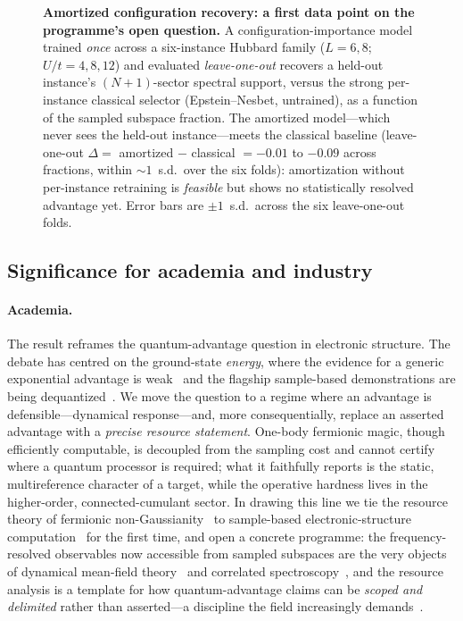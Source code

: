 \begin{figure}[htbp]\centering
\caption{\textbf{Amortized configuration recovery: a first data point on the programme's open question.}
A configuration-importance model trained \emph{once} across a six-instance Hubbard family
($L=6,8$; $U/t=4,8,12$) and evaluated \emph{leave-one-out} recovers a held-out instance's
$(N{+}1)$-sector spectral support, versus the strong per-instance classical selector (Epstein--Nesbet,
untrained), as a function of the sampled subspace fraction. The amortized model---which never sees the
held-out instance---meets the classical baseline (leave-one-out $\Delta=$ amortized $-$ classical
$=-0.01$ to $-0.09$ across fractions, within $\sim\!1$~s.d.\ over the six folds): amortization without
per-instance retraining is \emph{feasible} but shows no statistically resolved advantage yet. Error bars
are $\pm1$~s.d.\ across the six leave-one-out folds.}\label{fig:amort}\end{figure}

\subsection{Significance for academia and industry}

\paragraph{Academia.} The result reframes the quantum-advantage question in electronic structure. The
debate has centred on the ground-state \emph{energy}, where the evidence for a generic exponential
advantage is weak~\cite{leechan2023} and the flagship sample-based demonstrations are being
dequantized~\cite{belagali2026,reinholdt2025}. We move the question to a regime where an advantage is
defensible---dynamical response---and, more consequentially, replace an asserted advantage with a
\emph{precise resource statement}. One-body fermionic magic, though efficiently computable, is
decoupled from the sampling cost and cannot certify where a quantum processor is required; what it
faithfully reports is the static, multireference character of a target, while the operative hardness
lives in the higher-order, connected-cumulant sector. In drawing this line we tie the resource theory
of fermionic non-Gaussianity~\cite{hebenstreit2019,sierant2026,tarabunga2026} to sample-based
electronic-structure computation~\cite{robledomoreno2025,kanno2023} for the first time, and open a
concrete programme: the frequency-resolved observables now accessible from sampled subspaces are the
very objects of dynamical mean-field theory~\cite{dmft1996} and correlated
spectroscopy~\cite{damascelli2003}, and the resource analysis is a template for how quantum-advantage
claims can be \emph{scoped and delimited} rather than asserted---a discipline the field increasingly
demands~\cite{leechan2023,babbush2021,cerezo2025bp}.

